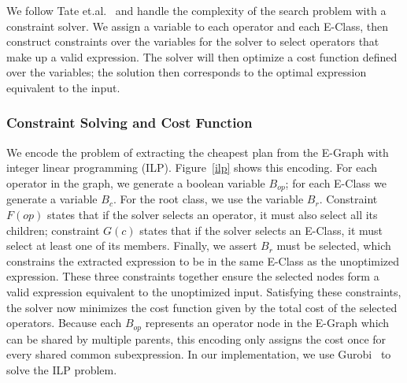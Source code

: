 We follow Tate et.al.~\cite{DBLP:journals/corr/abs-1012-1802} 
and handle the complexity of the search problem with a constraint
solver. We assign a variable to each operator and each E-Class, then construct
constraints over the variables for the solver to select operators that make up a
valid expression. The solver will then optimize a cost function defined over the
variables; the solution then corresponds to the optimal expression equivalent to
the input.  

\subsubsection*{Constraint Solving and Cost Function}
We encode the problem of extracting the cheapest plan from the E-Graph with
integer linear programming (ILP). Figure~\ref{ilp} shows this encoding. For each
operator in the graph, we generate a boolean variable $B_{op}$; for each E-Class
we generate a variable $B_c$. For the root class, we use the variable $B_r$.
Constraint $F(op)$ states that if the solver selects an operator, it must also
select all its children; constraint $G(c)$ states that if the solver selects an
E-Class, it must select at least one of its members. Finally, we assert $B_r$ must 
be selected, which constrains the extracted expression
to be in the same E-Class as the unoptimized expression. These three constraints together
ensure the
selected nodes form a valid expression equivalent to the unoptimized input.
Satisfying these constraints, the solver now minimizes the cost function given
by the total cost of the selected operators. Because each $B_{op}$ represents an
operator node in the E-Graph which can be shared by multiple parents, this
encoding only assigns the cost once for every shared common subexpression. In
our implementation, we use Gurobi~\cite{gurobi} to solve the ILP problem.

